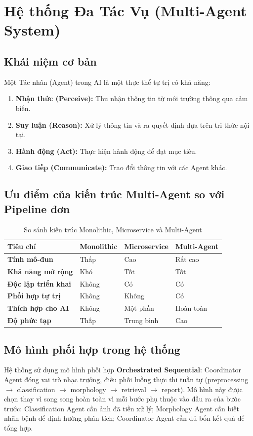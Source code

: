 \documentclass[13pt,a4paper]{extreport}
\begin{document}
\section{Hệ thống Đa Tác Vụ (Multi-Agent System)}

\subsection{Khái niệm cơ bản}
Một Tác nhân (Agent) trong AI là một thực thể tự trị có khả năng:
\begin{enumerate}[leftmargin=1.5cm]
    \item \textbf{Nhận thức (Perceive):} Thu nhận thông tin từ môi trường thông qua cảm biến.
    \item \textbf{Suy luận (Reason):} Xử lý thông tin và ra quyết định dựa trên tri thức nội tại.
    \item \textbf{Hành động (Act):} Thực hiện hành động để đạt mục tiêu.
    \item \textbf{Giao tiếp (Communicate):} Trao đổi thông tin với các Agent khác.
\end{enumerate}

\subsection{Ưu điểm của kiến trúc Multi-Agent so với Pipeline đơn}
\begin{table}[H]
\centering
\caption{So sánh kiến trúc Monolithic, Microservice và Multi-Agent}
\label{tab:arch_comparison}
\begin{tabularx}{\textwidth}{>{\bfseries}p{3.2cm} X X X}
\toprule
\textbf{Tiêu chí} & \textbf{Monolithic} & \textbf{Microservice} & \textbf{Multi-Agent} \\
\midrule
Tính mô-đun & Thấp & Cao & Rất cao \\[3pt]
Khả năng mở rộng & Khó & Tốt & Tốt \\[3pt]
Độc lập triển khai & Không & Có & Có \\[3pt]
Phối hợp tự trị & Không & Không & Có \\[3pt]
Thích hợp cho AI & Không & Một phần & Hoàn toàn \\[3pt]
Độ phức tạp & Thấp & Trung bình & Cao \\
\bottomrule
\end{tabularx}
\end{table}

\subsection{Mô hình phối hợp trong hệ thống}
Hệ thống sử dụng mô hình phối hợp \textbf{Orchestrated Sequential}: Coordinator Agent đóng vai trò nhạc trưởng, điều phối luồng thực thi tuần tự (preprocessing $\rightarrow$ classification $\rightarrow$ morphology $\rightarrow$ retrieval $\rightarrow$ report). Mô hình này được chọn thay vì song song hoàn toàn vì mỗi bước phụ thuộc vào đầu ra của bước trước: Classification Agent cần ảnh đã tiền xử lý; Morphology Agent cần biết nhãn bệnh để định hướng phân tích; Coordinator Agent cần đủ bốn kết quả để tổng hợp.
\end{document}
